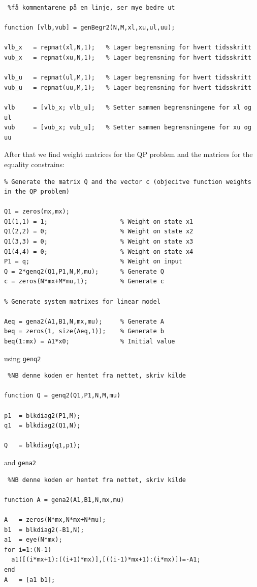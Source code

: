 \vspace{1cm}
\begin{lstlisting} %få kommentarene på en linje, ser mye bedre ut

function [vlb,vub] = genBegr2(N,M,xl,xu,ul,uu);

vlb_x	= repmat(xl,N,1);	% Lager begrensning for hvert tidsskritt
vub_x	= repmat(xu,N,1);	% Lager begrensning for hvert tidsskritt

vlb_u	= repmat(ul,M,1);	% Lager begrensning for hvert tidsskritt
vub_u	= repmat(uu,M,1);	% Lager begrensning for hvert tidsskritt

vlb	    = [vlb_x; vlb_u];	% Setter sammen begrensningene for xl og ul
vub	    = [vub_x; vub_u];	% Setter sammen begrensningene for xu og uu
\end{lstlisting}

After that we find weight matrices for the QP problem and the matrices for the equality constrains:
\begin{lstlisting}
% Generate the matrix Q and the vector c (objecitve function weights in the QP problem) 

Q1 = zeros(mx,mx);
Q1(1,1) = 1;                	% Weight on state x1
Q1(2,2) = 0;                	% Weight on state x2
Q1(3,3) = 0;                	% Weight on state x3
Q1(4,4) = 0;                	% Weight on state x4
P1 = q;                     	% Weight on input
Q = 2*genq2(Q1,P1,N,M,mu);  	% Generate Q
c = zeros(N*mx+M*mu,1);     	% Generate c

% Generate system matrixes for linear model

Aeq = gena2(A1,B1,N,mx,mu); 	% Generate A
beq = zeros(1, size(Aeq,1));	% Generate b
beq(1:mx) = A1*x0; 	        	% Initial value
\end{lstlisting}
using \texttt{genq2} 

\begin{lstlisting} %NB denne koden er hentet fra nettet, skriv kilde

function Q = genq2(Q1,P1,N,M,mu)

p1	= blkdiag2(P1,M);
q1	= blkdiag2(Q1,N);

Q	= blkdiag(q1,p1); 
\end{lstlisting}
and \texttt{gena2}

\begin{lstlisting} %NB denne koden er hentet fra nettet, skriv kilde

function A = gena2(A1,B1,N,mx,mu)

A 	= zeros(N*mx,N*mx+N*mu);
b1	= blkdiag2(-B1,N);
a1	= eye(N*mx);
for i=1:(N-1)
  a1([(i*mx+1):((i+1)*mx)],[((i-1)*mx+1):(i*mx)])=-A1;
end
A	= [a1 b1];
\end{lstlisting}

